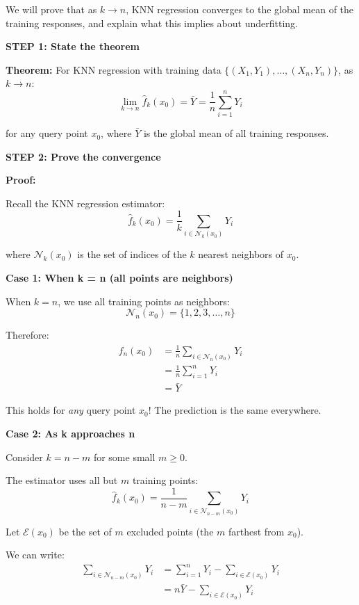 \documentclass[12pt]{article}
\begin{document}
\begin{solution}
We will prove that as \(k \to n\), KNN regression converges to the global mean of the training responses, and explain what this implies about underfitting.

\textbf{STEP 1: State the theorem}

\textbf{Theorem:} For KNN regression with training data \(\{(X_1, Y_1), \ldots, (X_n, Y_n)\}\), as \(k \to n\):
\[
\lim_{k \to n} \hat{f}_k(x_0) = \bar{Y} = \frac{1}{n}\sum_{i=1}^n Y_i
\]

for any query point \(x_0\), where \(\bar{Y}\) is the global mean of all training responses.

\textbf{STEP 2: Prove the convergence}

\textbf{Proof:}

Recall the KNN regression estimator:
\[
\hat{f}_k(x_0) = \frac{1}{k} \sum_{i \in \mathcal{N}_k(x_0)} Y_i
\]

where \(\mathcal{N}_k(x_0)\) is the set of indices of the \(k\) nearest neighbors of \(x_0\).

\textbf{Case 1: When k = n (all points are neighbors)}

When \(k = n\), we use all training points as neighbors:
\[
\mathcal{N}_n(x_0) = \{1, 2, 3, \ldots, n\}
\]

Therefore:
\begin{align*}
\hat{f}_n(x_0) &= \frac{1}{n} \sum_{i \in \mathcal{N}_n(x_0)} Y_i \\
&= \frac{1}{n} \sum_{i=1}^n Y_i \\
&= \bar{Y}
\end{align*}

This holds for \textit{any} query point \(x_0\)! The prediction is the same everywhere.

\textbf{Case 2: As k approaches n}

Consider \(k = n - m\) for some small \(m \geq 0\).

The estimator uses all but \(m\) training points:
\[
\hat{f}_k(x_0) = \frac{1}{n-m} \sum_{i \in \mathcal{N}_{n-m}(x_0)} Y_i
\]

Let \(\mathcal{E}(x_0)\) be the set of \(m\) excluded points (the \(m\) farthest from \(x_0\)).

We can write:
\begin{align*}
\sum_{i \in \mathcal{N}_{n-m}(x_0)} Y_i &= \sum_{i=1}^n Y_i - \sum_{i \in \mathcal{E}(x_0)} Y_i \\
&= n\bar{Y} - \sum_{i \in \mathcal{E}(x_0)} Y_i
\end{align*}


\end{solution}
\end{document}
